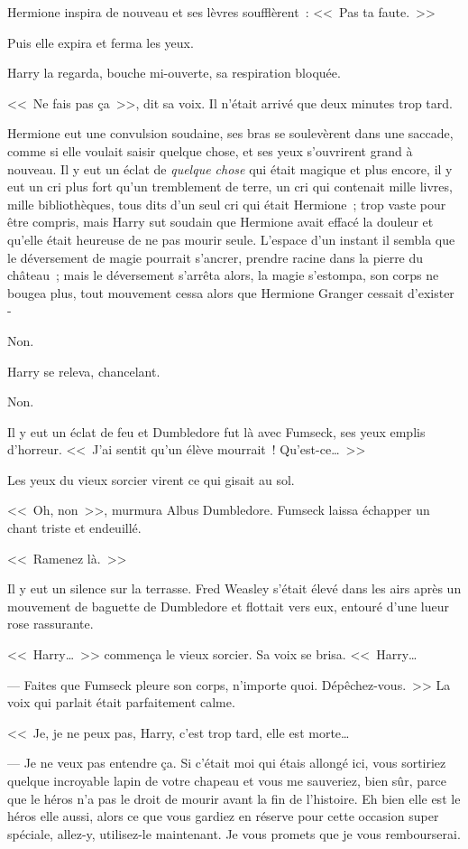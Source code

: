 Hermione inspira de nouveau et ses lèvres soufflèrent~: <<~Pas ta faute.~>>

Puis elle expira et ferma les yeux.

Harry la regarda, bouche mi-ouverte, sa respiration bloquée.

<<~Ne fais pas ça~>>, dit sa voix. Il n'était arrivé que deux minutes trop tard.

Hermione eut une convulsion soudaine, ses bras se soulevèrent dans une saccade, comme si elle voulait saisir quelque chose, et ses yeux s'ouvrirent grand à nouveau. Il y eut un éclat de \emph{quelque chose} qui était magique et plus encore, il y eut un cri plus fort qu'un tremblement de terre, un cri qui contenait mille livres, mille bibliothèques, tous dits d'un seul cri qui était Hermione~; trop vaste pour être compris, mais Harry sut soudain que Hermione avait effacé la douleur et qu'elle était heureuse de ne pas mourir seule. L'espace d'un instant il sembla que le déversement de magie pourrait s'ancrer, prendre racine dans la pierre du château~; mais le déversement s'arrêta alors, la magie s'estompa, son corps ne bougea plus, tout mouvement cessa alors que Hermione Granger cessait d'exister -

Non.

Harry se releva, chancelant.

Non.

Il y eut un éclat de feu et Dumbledore fut là avec Fumseck, ses yeux emplis d'horreur. <<~J'ai sentit qu'un élève mourrait~! Qu'est-ce…~>>

Les yeux du vieux sorcier virent ce qui gisait au sol.

<<~Oh, non~>>, murmura Albus Dumbledore. Fumseck laissa échapper un chant triste et endeuillé.

<<~Ramenez là.~>>

Il y eut un silence sur la terrasse. Fred Weasley s'était élevé dans les airs après un mouvement de baguette de Dumbledore et flottait vers eux, entouré d'une lueur rose rassurante.

<<~Harry…~>> commença le vieux sorcier. Sa voix se brisa. <<~Harry…

--- Faites que Fumseck pleure son corps, n'importe quoi. Dépêchez-vous.~>> La voix qui parlait était parfaitement calme.

<<~Je, je ne peux pas, Harry, c'est trop tard, elle est morte…

--- Je ne veux pas entendre ça. Si c'était moi qui étais allongé ici, vous sortiriez quelque incroyable lapin de votre chapeau et vous me sauveriez, bien sûr, parce que le héros n'a pas le droit de mourir avant la fin de l'histoire. Eh bien elle est le héros elle aussi, alors ce que vous gardiez en réserve pour cette occasion super spéciale, allez-y, utilisez-le maintenant. Je vous promets que je vous rembourserai.


